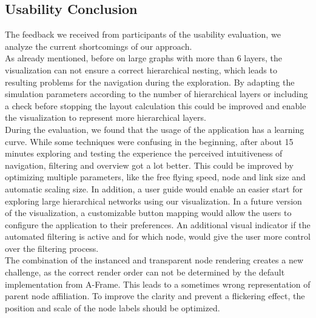 \subsection{Usability Conclusion}
The feedback we received from participants of the usability evaluation, we analyze the current shortcomings of our approach.
\\
As already mentioned, before on large graphs with more than 6 layers, the visualization can not ensure a correct hierarchical nesting, which leads to resulting problems for the navigation during the exploration. 
By adapting the simulation parameters according to the number of hierarchical layers or including a check before stopping the layout calculation this could be improved and enable the visualization to represent more hierarchical layers.
\\
During the evaluation, we found that the usage of the application has a learning curve. 
While some techniques were confusing in the beginning, after about 15 minutes exploring and testing the experience the perceived intuitiveness of navigation, filtering and overview got a lot better.
This could be improved by optimizing multiple parameters, like the free flying speed, node and link size and automatic scaling size. 
In addition, a user guide would enable an easier start for exploring large hierarchical networks using our visualization.
In a future version of the visualization, a customizable button mapping would allow the users to configure the application to their preferences.
An additional visual indicator if the automated filtering is active and for which node, would give the user more control over the filtering process.
\\
The combination of the instanced and transparent node rendering creates a new challenge, as the correct render order can not be determined by the default implementation from A-Frame. This leads to a sometimes wrong representation of parent node affiliation.
To improve the clarity and prevent a flickering effect, the position and scale of the node labels should be optimized.
